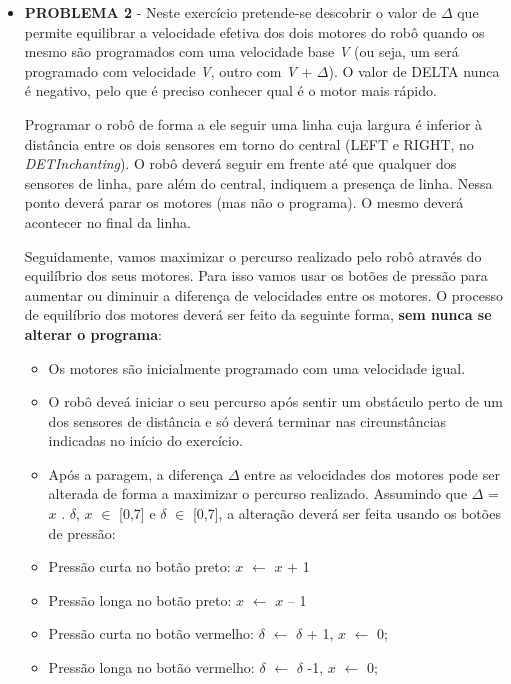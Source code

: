 \documentclass[a4paper, 12pt, onecolumn, oneside]{report}
\begin{document}
\begin{itemize}
  \item \textbf{PROBLEMA 2} -  Neste exercício pretende-se descobrir o valor de $ \Delta $ que permite equilibrar a velocidade efetiva dos dois motores do robô quando os mesmo são programados com uma velocidade base \emph{V} (ou seja, um será programado com velocidade \emph{V}, outro com \emph{V} + $ \Delta $). O valor de DELTA nunca é negativo, pelo que é preciso conhecer qual é o motor mais rápido.


Programar o robô de forma a ele seguir uma linha cuja largura é inferior à distância entre os dois sensores em torno do central (LEFT e RIGHT, no \emph{DETInchanting}). O robô deverá seguir em frente até que qualquer dos sensores de linha, pare além do central, indiquem a presença de linha. Nessa ponto deverá parar os motores (mas não o programa). O mesmo deverá acontecer no final da linha.

Seguidamente, vamos maximizar o percurso realizado pelo robô através do equilíbrio dos seus motores. Para isso vamos usar os botões de pressão para aumentar ou diminuir a diferença de velocidades entre os motores. O processo de equilíbrio dos motores deverá ser feito da seguinte forma, \textbf{sem nunca se alterar o programa}:

\begin{itemize}
  
 \item Os motores são inicialmente programado com uma velocidade igual.

 \item O robô deveá iniciar o seu percurso após sentir um obstáculo perto de um dos sensores de distância e só deverá terminar nas circunstâncias indicadas no início do exercício.

 \item Após a paragem, a diferença $ \Delta $ entre as velocidades dos motores pode ser alterada de forma a maximizar o percurso realizado. Assumindo que $ \Delta $ = $ x $ . $ \delta $,  $ x $ $ \in $ [0,7]
 e $ \delta $ $ \in $ [0,7], a alteração deverá ser feita usando os botões de pressão:
 \item Pressão curta no botão preto: $ x $ $ \longleftarrow $ $ x $ + 1
 \item Pressão longa no botão preto: $ x $ $ \longleftarrow $ $ x $ – 1
 \item Pressão curta no botão vermelho: $ \delta $ $ \longleftarrow $ $ \delta $ + 1, $ x $ $ \longleftarrow $ 0;
 \item Pressão longa no botão vermelho: $ \delta $ $ \longleftarrow $ $ \delta $ -1, $ x $ $ \longleftarrow $ 0;
\\


\end{itemize}
\end{itemize}
\end{document}
